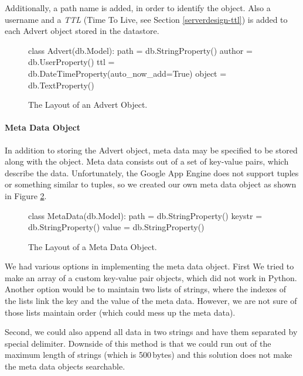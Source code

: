 Additionally, a path name is added, in order to identify the object. Also a
username and a \emph{TTL} (Time To Live, see Section \ref{serverdesign-ttl}) is
added to each Advert object stored in the datastore.

\begin{figure}[ht] %
\begin{center}
\begin{code}
class Advert(db.Model):
  path   = db.StringProperty()
  author = db.UserProperty()
  ttl    = db.DateTimeProperty(auto_now_add=True)
  object = db.TextProperty() 
\end{code}
\caption{The Layout of an Advert Object.\label{serverdesign-advert-obj}}
\end{center}
\end{figure}

\paragraph{Meta Data Object}
In addition to storing the Advert object, meta data may be specified to be
stored along with the object. Meta data consists out of a set of key-value
pairs, which describe the data. Unfortunately, the Google App Engine does not
support tuples or something similar to tuples, so we created our own meta data
object as shown in Figure \ref{serverdesign-metadata-obj}.

\begin{figure}[ht] %
\begin{center}
\begin{code}
class MetaData(db.Model):
  path   = db.StringProperty()
  keystr = db.StringProperty()
  value  = db.StringProperty()
\end{code}
\caption{The Layout of a Meta Data Object.\label{serverdesign-metadata-obj}}
\end{center}
\end{figure}

We had various options in implementing the meta data object. First We tried to
make an array of a custom key-value pair objects, which did not work in Python.
Another option would be to maintain two lists of strings, where the indexes of
the lists link the key and the value of the meta data. However, we are not sure
of those lists maintain order (which could mess up the meta data).

Second, we could also append all data in two strings and have them separated by
special delimiter. Downside of this method is that we could run out of the
maximum length of strings (which is 500\,bytes) and this solution does not make
the meta data objects searchable. 

